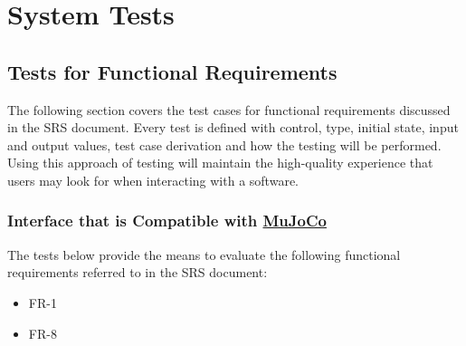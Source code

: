 \documentclass[12pt, titlepage]{article}
\begin{document}


\section{System Tests}


\subsection{Tests for Functional Requirements}

The following section covers the test cases for functional requirements discussed in the SRS document. Every test is defined with control, type, initial state, input and output values, test case derivation and how the testing will be performed. Using this approach of testing will maintain the high-quality experience that users may look for when interacting with a software.

\subsubsection{Interface that is Compatible with \href{https://mujoco.org/}{MuJoCo}}

The tests below provide the means to evaluate the following functional requirements referred to in the SRS document:
\begin{itemize}
  \item FR-1
  \item FR-8
\end{itemize}
\end{document}
